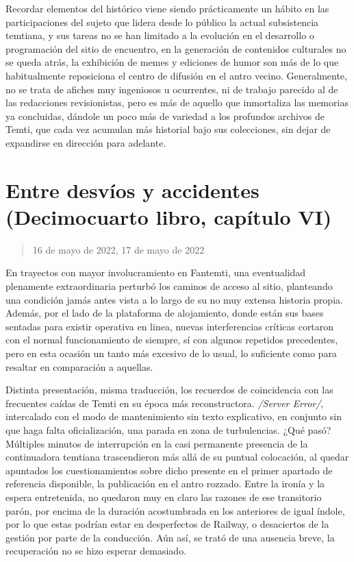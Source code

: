 \documentclass[
]{book}
\begin{document}
Recordar elementos del histórico viene siendo prácticamente un hábito en las participaciones del sujeto que lidera desde lo público la actual subsistencia temtiana, y sus tareas no se han limitado a la evolución en el desarrollo o programación del sitio de encuentro, en la generación de contenidos culturales no se queda atrás, la exhibición de memes y ediciones de humor son más de lo que habitualmente reposiciona el centro de difusión en el antro vecino. Generalmente, no se trata de afiches muy ingeniosos u ocurrentes, ni de trabajo parecido al de las redacciones revisionistas, pero es más de aquello que inmortaliza las memorias ya concluidas, dándole un poco más de variedad a los profundos archivos de Temti, que cada vez acumulan más historial bajo sus colecciones, sin dejar de expandirse en dirección para adelante.

\hypertarget{entre-desvuxedos-y-accidentes-decimocuarto-libro-capuxedtulo-vi}{%
\section{Entre desvíos y accidentes (Decimocuarto libro, capítulo VI)}\label{entre-desvuxedos-y-accidentes-decimocuarto-libro-capuxedtulo-vi}}

\begin{quote}
16 de mayo de 2022, 17 de mayo de 2022
\end{quote}

En trayectos con mayor involucramiento en Fantemti, una eventualidad plenamente extraordinaria perturbó los caminos de acceso al sitio, planteando una condición jamás antes vista a lo largo de su no muy extensa historia propia. Además, por el lado de la plataforma de alojamiento, donde están sus bases sentadas para existir operativa en linea, nuevas interferencias críticas cortaron con el normal funcionamiento de siempre, sí con algunos repetidos precedentes, pero en esta ocasión un tanto más excesivo de lo usual, lo suficiente como para resaltar en comparación a aquellas.

Distinta presentación, misma traducción, los recuerdos de coincidencia con las frecuentes caídas de Temti en su época más reconstructora. \emph{/Server Error/}, intercalado con el modo de mantenimiento sin texto explicativo, en conjunto sin que haga falta oficialización, una parada en zona de turbulencias. ¿Qué pasó? Múltiples minutos de interrupción en la casi permanente presencia de la continuadora temtiana trascendieron más allá de su puntual colocación, al quedar apuntados los cuestionamientos sobre dicho presente en el primer apartado de referencia disponible, la publicación en el antro rozzado. Entre la ironía y la espera entretenida, no quedaron muy en claro las razones de ese transitorio parón, por encima de la duración acostumbrada en los anteriores de igual índole, por lo que estas podrían estar en desperfectos de Railway, o desaciertos de la gestión por parte de la conducción. Aún así, se trató de una ausencia breve, la recuperación no se hizo esperar demasiado.
\end{document}
